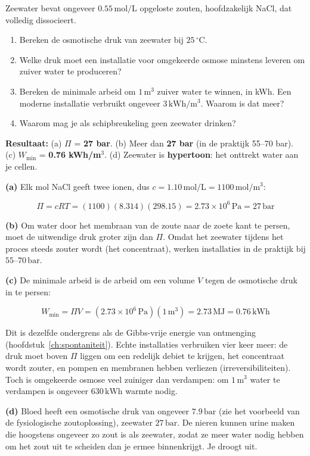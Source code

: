 \begin{oefening}
Zeewater bevat ongeveer \(0.55\,\mathrm{mol/L}\) opgeloste zouten, hoofdzakelijk NaCl, dat volledig dissocieert.

\begin{enumerate}
\item[(a)]
  Bereken de osmotische druk van zeewater bij \(25\,^\circ\mathrm{C}\).
\item[(b)]
  Welke druk moet een installatie voor omgekeerde osmose minstens leveren om zuiver water te produceren?
\item[(c)]
  Bereken de minimale arbeid om \(1\,\mathrm{m^3}\) zuiver water te winnen, in kWh. Een moderne installatie verbruikt ongeveer \(3\,\mathrm{kWh/m^3}\). Waarom is dat meer?
\item[(d)]
  Waarom mag je als schipbreukeling geen zeewater drinken?
\end{enumerate}
\end{oefening}
\begin{oplossing}
\textbf{Resultaat:} (a) \(\Pi\) = \textbf{27 bar}. (b) Meer dan \textbf{27 bar} (in de praktijk 55--70 bar). (c) \(W_{\min}\) = \textbf{0.76 kWh/m\ensuremath{^{3}}}. (d) Zeewater is \textbf{hypertoon}: het onttrekt water aan je cellen.

\textbf{(a)} Elk mol NaCl geeft twee ionen, dus \(c = 1.10\,\mathrm{mol/L} = 1100\,\mathrm{mol/m^3}\):

\[
\Pi = cRT = (1100)(8.314)(298.15) = 2.73\times10^{6}\,\mathrm{Pa} = 27\,\mathrm{bar}
\]

\textbf{(b)} Om water door het membraan van de zoute naar de zoete kant te persen, moet de uitwendige druk groter zijn dan \(\Pi\). Omdat het zeewater tijdens het proces steeds zouter wordt (het concentraat), werken installaties in de praktijk bij \(55\)--\(70\,\mathrm{bar}\).

\textbf{(c)} De minimale arbeid is de arbeid om een volume \(V\) tegen de osmotische druk in te persen:

\[
W_{\min} = \Pi V = (2.73\times10^{6}\,\mathrm{Pa})(1\,\mathrm{m^3}) = 2.73\,\mathrm{MJ} = 0.76\,\mathrm{kWh}
\]

Dit is dezelfde ondergrens als de Gibbs-vrije energie van ontmenging (hoofdstuk~\ref{ch:spontaniteit}). Echte installaties verbruiken vier keer meer: de druk moet boven \(\Pi\) liggen om een redelijk debiet te krijgen, het concentraat wordt zouter, en pompen en membranen hebben verliezen (irreversibiliteiten). Toch is omgekeerde osmose veel zuiniger dan verdampen: om \(1\,\mathrm{m^3}\) water te verdampen is ongeveer \(630\,\mathrm{kWh}\) warmte nodig.

\textbf{(d)} Bloed heeft een osmotische druk van ongeveer \(7.9\,\mathrm{bar}\) (zie het voorbeeld van de fysiologische zoutoplossing), zeewater \(27\,\mathrm{bar}\). De nieren kunnen urine maken die hoogstens ongeveer zo zout is als zeewater, zodat ze meer water nodig hebben om het zout uit te scheiden dan je ermee binnenkrijgt. Je droogt uit.
\end{oplossing}

